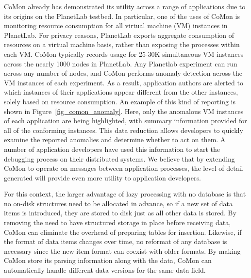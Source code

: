 CoMon already has demonstrated its utility across a range of
applications due to its origins on the PlanetLab testbed. In
particular, one of the uses of CoMon is monitoring resource
consumption for all virtual machine (VM) instances in PlanetLab. For
privacy reasons, PlanetLab exports aggregate consumption of resources
on a virtual machine basis, rather than exposing the processes within
each VM. CoMon typically records usage for 25-30K simultaneous VM
instances across the nearly 1000 nodes in PlanetLab. Any Planetlab
experiment can run across any number of nodes, and CoMon performs
anomaly detection across the VM instances of each experiment. As a
result, application authors are alerted to which instances of their
applications appear different from the other instances, solely based
on resource consumption. An example of this kind of reporting is shown
in Figure~\ref{fig_comon_anomaly}. Here, only the anomalous VM
instances of each application are being highlighted, with summary
information provided for all of the conforming instances. This data
reduction allows developers to quickly examine the reported anomalies
and determine whether to act on them. A number of application
developers have used this information to start the debugging process
on their distributed systems. We believe that by extending CoMon to
operate on messages between application processes, the level of detail
generated will provide even more utility to application developers.

For this context, the larger advantage of lazy processing with no
database is that no on-disk structures need to be allocated in
advance, so if a new set of data items is introduced, they are stored
to disk just as all other data is stored. By removing the need to have
structured storage in place before receiving data, CoMon can eliminate
the overhead of preparing tables for insertion. Likewise, if the
format of data items changes over time, no reformat of any database is
necessary since the new item format can coexist with older formats. By
making CoMon store its parsing information along with the data, CoMon
can automatically handle different data versions for the same data
field.


